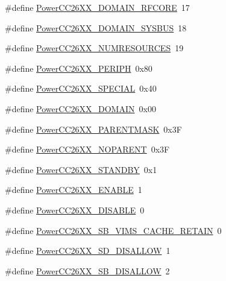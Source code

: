 \begin{DoxyCompactItemize}
\item 
\#define \hyperlink{_power_c_c26_x_x_8h_ad86ecb1e5493071d9b856137ebfeba1c}{Power\+C\+C26\+X\+X\+\_\+\+D\+O\+M\+A\+I\+N\+\_\+\+R\+F\+C\+O\+R\+E}~17
\item 
\#define \hyperlink{_power_c_c26_x_x_8h_a2f6486327eb9ca7b1c746fa8def3546b}{Power\+C\+C26\+X\+X\+\_\+\+D\+O\+M\+A\+I\+N\+\_\+\+S\+Y\+S\+B\+U\+S}~18
\item 
\#define \hyperlink{_power_c_c26_x_x_8h_af422d71a354f486c975a44e0dddd5845}{Power\+C\+C26\+X\+X\+\_\+\+N\+U\+M\+R\+E\+S\+O\+U\+R\+C\+E\+S}~19
\item 
\#define \hyperlink{_power_c_c26_x_x_8h_a7f728bf46093133833f2fca6aa0b1a45}{Power\+C\+C26\+X\+X\+\_\+\+P\+E\+R\+I\+P\+H}~0x80
\item 
\#define \hyperlink{_power_c_c26_x_x_8h_a71ab88328b4714f04f0760bf0c0b379e}{Power\+C\+C26\+X\+X\+\_\+\+S\+P\+E\+C\+I\+A\+L}~0x40
\item 
\#define \hyperlink{_power_c_c26_x_x_8h_aaac9b78f590a92473da9fedb416ea8fc}{Power\+C\+C26\+X\+X\+\_\+\+D\+O\+M\+A\+I\+N}~0x00
\item 
\#define \hyperlink{_power_c_c26_x_x_8h_a49e71a5759a8d5531645873ca821354c}{Power\+C\+C26\+X\+X\+\_\+\+P\+A\+R\+E\+N\+T\+M\+A\+S\+K}~0x3\+F
\item 
\#define \hyperlink{_power_c_c26_x_x_8h_a000487b9449a472c045c238b7d231b2f}{Power\+C\+C26\+X\+X\+\_\+\+N\+O\+P\+A\+R\+E\+N\+T}~0x3\+F
\item 
\#define \hyperlink{_power_c_c26_x_x_8h_acb2ec2d3aa2f104d5691710fd2ba89b7}{Power\+C\+C26\+X\+X\+\_\+\+S\+T\+A\+N\+D\+B\+Y}~0x1
\item 
\#define \hyperlink{_power_c_c26_x_x_8h_a2e35cc104df1405d4bbb24687b387751}{Power\+C\+C26\+X\+X\+\_\+\+E\+N\+A\+B\+L\+E}~1
\item 
\#define \hyperlink{_power_c_c26_x_x_8h_a9c6214ce3d742d5989a117ee4f7633aa}{Power\+C\+C26\+X\+X\+\_\+\+D\+I\+S\+A\+B\+L\+E}~0
\item 
\#define \hyperlink{_power_c_c26_x_x_8h_ad475ae30ba4421648b23bb3ec599744e}{Power\+C\+C26\+X\+X\+\_\+\+S\+B\+\_\+\+V\+I\+M\+S\+\_\+\+C\+A\+C\+H\+E\+\_\+\+R\+E\+T\+A\+I\+N}~0
\item 
\#define \hyperlink{_power_c_c26_x_x_8h_a4e0e14d6c5621145f47205dd87f7b093}{Power\+C\+C26\+X\+X\+\_\+\+S\+D\+\_\+\+D\+I\+S\+A\+L\+L\+O\+W}~1
\item 
\#define \hyperlink{_power_c_c26_x_x_8h_aa1089d61305a60c39857a3bcf2447b11}{Power\+C\+C26\+X\+X\+\_\+\+S\+B\+\_\+\+D\+I\+S\+A\+L\+L\+O\+W}~2
\item 

\end{DoxyCompactItemize}
